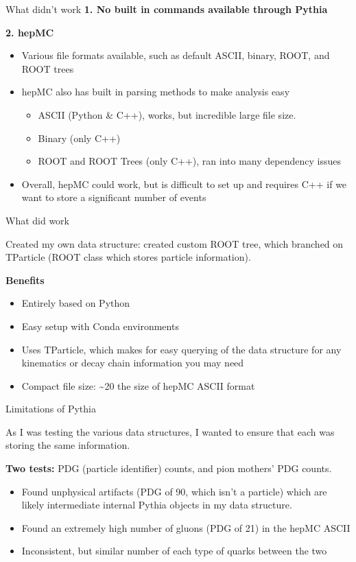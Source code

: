 \documentclass[10pt]{beamer}
\begin{document}
\begin{frame}{What didn't work}
\textbf{1. No built in commands available through Pythia}

\vspace{1em}
\textbf{2. hepMC}
\begin{itemize}
    \item Various file formats available, such as default ASCII, binary, ROOT, and ROOT trees
    \item hepMC also has built in parsing methods to make analysis easy
    \begin{itemize}
        \item ASCII (Python \& C++), works, but incredible large file size.
        \item Binary (only C++)
        \item ROOT and ROOT Trees (only C++), ran into many dependency issues
    \end{itemize}
    \item Overall, hepMC could work, but is difficult to set up and requires C++ if we want to store a significant number of events
\end{itemize}
    
\end{frame}

\begin{frame}{What did work}

Created my own data structure: created custom ROOT tree, which branched on TParticle (ROOT class which stores particle information).

\textbf{  } 

\textbf{Benefits}
\begin{itemize}
    \item Entirely based on Python
    \item Easy setup with Conda environments
    \item Uses TParticle, which makes for easy querying of the data structure for any kinematics or decay chain information you may need
    \item Compact file size: \textasciitilde20\text{\%} the size of hepMC ASCII format
\end{itemize}
\end{frame}

\begin{frame}{Limitations of Pythia}

As I was testing the various data structures, I wanted to ensure that each was storing the same information.

\textbf{Two tests:} PDG (particle identifier) counts, and pion mothers' PDG counts.
\begin{itemize}
    \item Found unphysical artifacts (PDG of 90, which isn't a particle) which are likely intermediate internal Pythia objects in my data structure.
    \item Found an extremely high number of gluons (PDG of 21) in the hepMC ASCII
    \item Inconsistent, but similar number of each type of quarks between the two
\end{itemize}
\end{frame}
\end{document}
